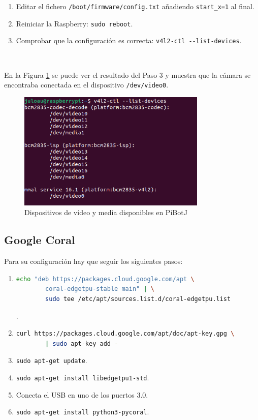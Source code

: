 \begin{enumerate}
	\item Editar el fichero \verb|/boot/firmware/config.txt| añadiendo \verb|start_x=1| al final.
	\item Reiniciar la Raspberry: \verb|sudo reboot|.
	\item Comprobar que la configuración es correcta: \verb|v4l2-ctl --list-devices|.
\end{enumerate}\

En la Figura \ref{fig:v4l2} se puede ver el resultado del Paso 3 y muestra que la cámara se encontraba conectada en el dispositivo \verb|/dev/video0|.

\begin{figure} [h!]
	\begin{center}
		\includegraphics[width=9cm]{figs/cap6/vl.png}
	\end{center}
	\caption{Dispositivos de vídeo y media disponibles en PiBotJ}
	\label{fig:v4l2}
\end{figure}


\subsection{Google Coral}
\label{subsec:anexogooglecoral}


Para su configuración hay que seguir los siguientes pasos: 

\begin{enumerate}
	\item 
	\begin{lstlisting}[language=bash]
		echo "deb https://packages.cloud.google.com/apt \
		coral-edgetpu-stable main" | \
		sudo tee /etc/apt/sources.list.d/coral-edgetpu.list
	\end{lstlisting}.
	\item
	\begin{lstlisting}[language=bash]
		curl https://packages.cloud.google.com/apt/doc/apt-key.gpg \
		| sudo apt-key add -
	\end{lstlisting}
	\item \verb|sudo apt-get update|.
	\item \verb|sudo apt-get install libedgetpu1-std|.
	\item Conecta el USB en uno de los puertos 3.0.
	\item \verb|sudo apt-get install python3-pycoral|.
\end{enumerate}\

